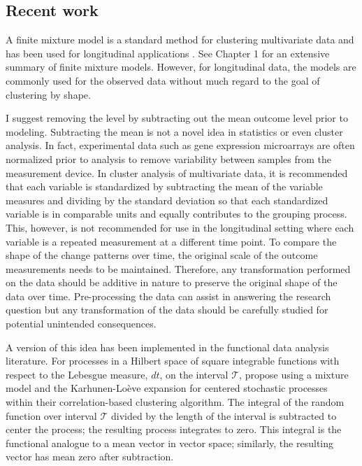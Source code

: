 \subsection{Recent work}
A finite mixture model is a standard method for clustering multivariate data \cite{everitt2009} and has been used for longitudinal applications \cite{muthen2010, jones2001}. See Chapter 1 for an extensive summary of finite mixture models. However, for longitudinal data, the models are commonly used for the observed data without much regard to the goal of clustering by shape. 

I suggest removing the level by subtracting out the mean outcome level prior to modeling. Subtracting the mean is not a novel idea in statistics or even cluster analysis. In fact, experimental data such as gene expression microarrays are often normalized prior to analysis to remove variability between samples from the measurement device. In cluster analysis of multivariate data, it is recommended that each variable is standardized by subtracting the mean of the variable measures and dividing by the standard deviation so that each standardized variable is in comparable units and equally contributes to the grouping process. This, however, is not recommended for use in the longitudinal setting where each variable is a repeated measurement at a different time point. To compare the shape of the change patterns over time, the original scale of the outcome measurements needs to be maintained. Therefore, any transformation performed on the data should be additive in nature to preserve the original shape of the data over time. Pre-processing the data can assist in answering the research question but any transformation of the data should be carefully studied for potential unintended consequences.

A version of this idea has been implemented in the functional data analysis literature. For processes in a Hilbert space of square integrable functions with respect to the Lebesgue measure, $dt$, on the interval $\mathcal{T}$, \textcite{chiou2008} propose using a mixture model and the Karhunen-Lo{\`e}ve expansion for centered stochastic processes within their correlation-based clustering algorithm. The integral of the random function over interval $\mathcal{T}$ divided by the length of the interval is subtracted to center the process; the resulting process integrates to zero. This integral is the functional analogue to a mean vector in vector space; similarly, the resulting vector has mean zero after subtraction.

